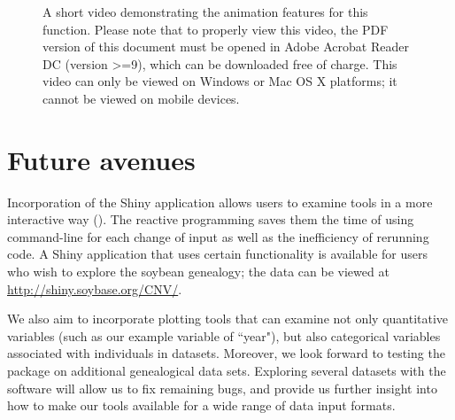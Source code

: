 \documentclass[article,shortnames]{jss}
\makeatletter
\newcommand{\mybox}[1]{%
  \setbox0=\hbox{#1}%
  \setlength{\@tempdima}{\dimexpr\wd0+13pt}%
  \begin{tcolorbox}[colframe=frameCol,colback=bgndCol,boxrule=0.5pt,arc=4pt,
      left=6pt,right=6pt,top=6pt,bottom=6pt,boxsep=0pt,width=\@tempdima]
    #1
  \end{tcolorbox}
}
\makeatother
\begin{document}
\begin{figure}[H]
    \centering
    \mediabutton[mediacommand=v1:playPause,]{\mybox{Play/Pause}}
    \caption{A short video demonstrating the animation features for this function. Please note that to properly view this video, the PDF version of this document must be opened in Adobe Acrobat Reader DC (version >=9), which can be downloaded free of charge. This video can only be viewed on Windows or Mac OS X platforms; it cannot be viewed on mobile devices.}
    \label{fig:plotAnimate}
\end{figure}

\section{Future avenues}

Incorporation of the Shiny application allows users to examine  tools in a more interactive way (\citealt{shiny}). The reactive programming saves them the time of using command-line for each change of input as well as the inefficiency of rerunning code. A Shiny application that uses certain  functionality is available for users who wish to explore the soybean genealogy; the data can be viewed at \url{http://shiny.soybase.org/CNV/}.

We also aim to incorporate plotting tools that can examine not only quantitative variables (such as our example variable of ``year"), but also categorical variables associated with individuals in datasets. Moreover, we look forward to testing the  package on additional genealogical data sets. Exploring several datasets with the software will allow us to fix remaining bugs, and provide us further insight into how to make our tools available for a wide range of data input formats. 
\end{document}
